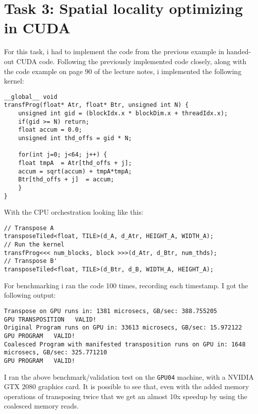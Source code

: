 \documentclass[11pt]{article}
\begin{document}
\section{Task 3: Spatial locality optimizing in CUDA}
\label{sec:org6ed391d}
For this task, i had to implement the code from the previous example in handed-out 
CUDA code. Following the previously implemented code closely, along with the code
example on page 90 of the lecture notes, i implemented the following kernel:
\begin{verbatim}
__global__ void 
transfProg(float* Atr, float* Btr, unsigned int N) {
    unsigned int gid = (blockIdx.x * blockDim.x + threadIdx.x);
    if(gid >= N) return;
    float accum = 0.0;
    unsigned int thd_offs = gid * N;

    for(int j=0; j<64; j++) {
	float tmpA  = Atr[thd_offs + j];
	accum = sqrt(accum) + tmpA*tmpA;
	Btr[thd_offs + j]  = accum;
    }
}
\end{verbatim}
With the CPU orchestration looking like this:
\begin{verbatim}
// Transpose A
transposeTiled<float, TILE>(d_A, d_Atr, HEIGHT_A, WIDTH_A);
// Run the kernel
transfProg<<< num_blocks, block >>>(d_Atr, d_Btr, num_thds);
// Transpose B'
transposeTiled<float, TILE>(d_Btr, d_B, WIDTH_A, HEIGHT_A);
\end{verbatim}
For benchmarking i ran the code 100 times, recording each timestamp. I 
got the following output:
\begin{verbatim}
Transpose on GPU runs in: 1381 microsecs, GB/sec: 388.755205
GPU TRANSPOSITION   VALID!
Original Program runs on GPU in: 33613 microsecs, GB/sec: 15.972122
GPU PROGRAM   VALID!
Coalesced Program with manifested transposition runs on GPU in: 1648 microsecs, GB/sec: 325.771210
GPU PROGRAM   VALID!
\end{verbatim}
I ran the above benchmark/validation test on the \texttt{GPU04} machine, with a
NVIDIA GTX 2080 graphics card. It is possible to see that, even with the
added memory operations of transposing twice that we get an almost 10x
speedup by using the coalesced memory reads.
\end{document}
